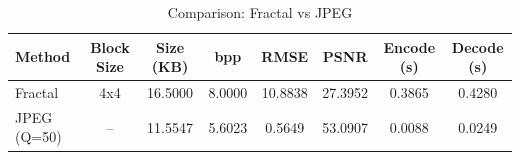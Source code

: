 \begin{table}[h]
\caption{Comparison: Fractal vs JPEG}
\label{tab:compression}
\begin{tabular}{lccccccc}
\toprule
Method & Block Size & Size (KB) & bpp & RMSE & PSNR & Encode (s) & Decode (s) \\
\midrule
Fractal & 4x4 & 16.5000 & 8.0000 & 10.8838 & 27.3952 & 0.3865 & 0.4280 \\
JPEG (Q=50) & -- & 11.5547 & 5.6023 & 0.5649 & 53.0907 & 0.0088 & 0.0249 \\
\bottomrule
\end{tabular}
\end{table}
